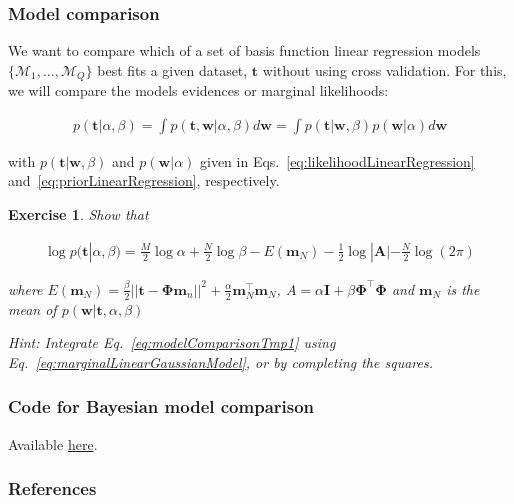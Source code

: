 \documentclass[11pt]{beamer}
\newtheorem{probExercise}{Exercise}
\begin{document}
\begin{frame}
    \frametitle{Model comparison}

    \scriptsize
    We want to compare which of a set of basis function linear regression
    models $\{\mathcal{M}_1,\ldots,\mathcal{M}_Q\}$ best fits a given dataset,
    $\mathbf{t}$ without using cross validation. For this, we will compare the
    models evidences or marginal likelihoods:

    \begin{align}
        p(\mathbf{t}|\alpha,\beta)=\int
        p(\mathbf{t},\mathbf{w}|\alpha,\beta)d\mathbf{w}=\int
        p(\mathbf{t}|\mathbf{w},\beta)p(\mathbf{w}|\alpha)d\mathbf{w}\label{eq:modelComparisonTmp1}
    \end{align}

    with $p(\mathbf{t}|\mathbf{w},\beta)$ and $p(\mathbf{w}|\alpha)$ given in
    Eqs.~\ref{eq:likelihoodLinearRegression}
    and~\ref{eq:priorLinearRegression}, respectively.

    \begin{probExercise}
        Show that

        \begin{align*}
            \log p(\mathbf{t}|\alpha,\beta)=\frac{M}{2}\log\alpha+\frac{N}{2}\log\beta-E(\mathbf{m}_N)-\frac{1}{2}\log|\mathbf{A}|-\frac{N}{2}\log(2\pi)
        \end{align*}

        where
        $E(\mathbf{m}_N)=\frac{\beta}{2}||\mathbf{t}-\boldsymbol{\Phi}\mathbf{m}_n||^2+\frac{\alpha}{2}\mathbf{m}_N^\intercal\mathbf{m}_N$,
        $A=\alpha\mathbf{I}+\beta\boldsymbol{\Phi}^\intercal\boldsymbol{\Phi}$
        and $\mathbf{m}_N$ is the mean of
        $p(\mathbf{w}|\mathbf{t},\alpha,\beta)$

        \vspace{0.5cm}
        Hint: Integrate Eq.~\ref{eq:modelComparisonTmp1} using
        Eq.~\ref{eq:marginalLinearGaussianModel}, or by completing the squares.

        \end{probExercise}
    \normalsize
\end{frame}

\begin{frame}
    \frametitle{Code for Bayesian model comparison}

    Available \href{https://joacorapela.github.io/gcnuBridging2023/auto\_examples/bayesianLinearRegression/plotModelsEvidences.html\#sphx-glr-auto-examples-bayesianlinearregression-plotmodelsevidences-py}{here}.

\end{frame}

\begin{frame}
    \frametitle{References}

    \tiny{
        
        
    }
\end{frame}
\end{document}
